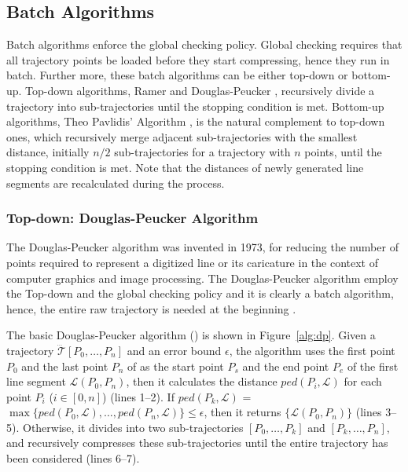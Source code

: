 \subsection{Batch Algorithms}

{Batch algorithms enforce the global checking policy}.
Global checking requires that all trajectory points be loaded before they start compressing, hence they run in batch.
Further more, these batch algorithms can be either top-down or bottom-up.
Top-down algorithms, \eg Ramer \cite{Ramer:Split} and Douglas-Peucker \cite{Douglas:Peucker}, recursively divide a trajectory into sub-trajectories until the stopping condition is met.
%
Bottom-up algorithms, \eg Theo Pavlidis' Algorithm \cite{Pavlidis:Segment}, is the natural complement to top-down ones, which recursively merge adjacent sub-trajectories with the smallest distance, initially $n/2$  sub-trajectories for a trajectory with $n$ points, until the stopping condition is met. Note that the distances of newly generated line segments are recalculated during the process.


\subsubsection{Top-down: Douglas-Peucker Algorithm}

The Douglas-Peucker algorithm \cite{Douglas:Peucker} was invented in 1973, for reducing the number of points required to represent a digitized line or its caricature in the context of computer graphics and image processing.
The Douglas-Peucker algorithm employ the Top-down and the global checking policy and it is clearly a batch algorithm, hence, the entire raw trajectory is needed at the beginning \cite{Meratnia:Spatiotemporal}.

The basic Douglas-Peucker algorithm (\dpa) is shown in Figure~\ref{alg:dp}.
Given a trajectory $\dddot{\mathcal{T}}[P_0, \ldots, P_n]$ and an error bound $\epsilon$, the algorithm uses the first point $P_0$ and the last point $P_n$ of  as the start point $P_s$ and the end point $P_e$ of the first line segment $\mathcal{L}(P_0, P_n)$, then it calculates the distance $ped(P_i, {\mathcal{L}})$ for each point $P_i$ ($i\in[0,n]$) (lines 1--2). If $ped(P_k, {\mathcal{L}})$ = $\max \{ped(P_0, {\mathcal{L}}), \ldots, ped(P_n, {\mathcal{L}}) \} \le \epsilon$, then it returns $\{\mathcal{L}(P_0,P_n)\}$ (lines 3--5). Otherwise, it divides  into two sub-trajectories $[P_0, \ldots, P_k]$ and $[P_{k}, \ldots, P_n]$, and recursively compresses these sub-trajectories until the entire trajectory has been considered (lines 6--7).


